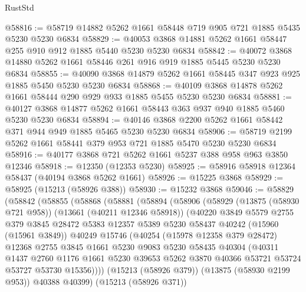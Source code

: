 \begin{lexlean}{RustStd}
\begin{coremodule}
@58816 := @58719 @14882 @5262 @1661 @58448 @719 @905 @721 @1885 @5435 @5230 @5230 @6834
@58829 := @40053 @3868 @14881 @5262 @1661 @58447 @255 @910 @912 @1885 @5440 @5230 @5230 @6834
@58842 := @40072 @3868 @14880 @5262 @1661 @58446 @261 @916 @919 @1885 @5445 @5230 @5230 @6834
@58855 := @40090 @3868 @14879 @5262 @1661 @58445 @347 @923 @925 @1885 @5450 @5230 @5230 @6834
@58868 := @40109 @3868 @14878 @5262 @1661 @58444 @290 @929 @933 @1885 @5455 @5230 @5230 @6834
@58881 := @40127 @3868 @14877 @5262 @1661 @58443 @363 @937 @940 @1885 @5460 @5230 @5230 @6834
@58894 := @40146 @3868 @2200 @5262 @1661 @58442 @371 @944 @949 @1885 @5465 @5230 @5230 @6834
@58906 := @58719 @2199 @5262 @1661 @58441 @379 @953 @721 @1885 @5470 @5230 @5230 @6834
@58916 := @40177 @3868 @721 @5262 @1661 @5237 @388 @958 @963 @3850 @12346
@58918 := @12350 (@12353 @5230)
@58925 := @58916 @58918 @12364 @58437 (@40194 @3868 @5262 @1661)
@58926 := @15225 @3868
@58929 := @58925 (@15213 (@58926 @388))
@58930 := @15232 @3868
@59046 := @58829
    (@58842
      (@58855
        (@58868
          (@58881
            (@58894
              (@58906
                (@58929
                  (@13875 (@58930 @721 @958))
                  (@13661 (@40211 @12346 @58918))
                  (@40220
                    @3849
                    @5579
                    @2755
                    @379
                    @3845
                    @28472
                    @5383
                    @12357
                    @5389
                    @5230
                    @58437
                    @40242
                    (@15960 (@15961 @3849))
                    @40249
                    @15746
                    (@40254
                      (@15978 @12358 @379 @28472)
                      @12368
                      @2755
                      @3845
                      @1661
                      @5230
                      @9083
                      @5230
                      @58435
                      @40304
                      (@40311
                        @1437
                        @2760
                        @1176
                        @1661
                        @5230
                        @39653
                        @5262
                        @3870
                        @40366
                        @53721
                        @53724
                        @53727
                        @53730
                        @15356))))
                (@15213 (@58926 @379))
                (@13875 (@58930 @2199 @953))
                @40388
                @40399)
              (@15213 (@58926 @371))

\end{coremodule}
\end{lexlean}
